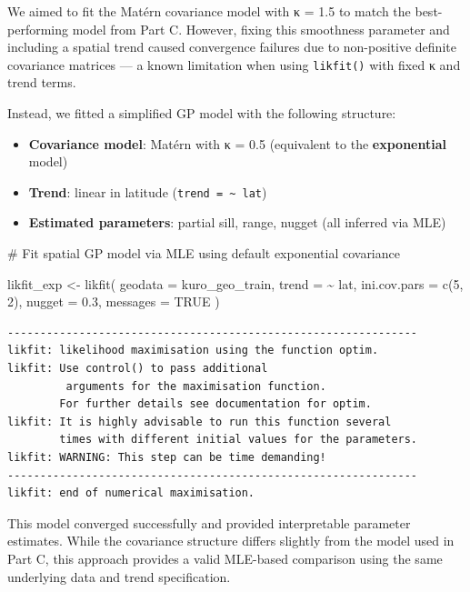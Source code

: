 \documentclass[
  11pt,
]{article}
\newenvironment{Shaded}{\begin{snugshade}}{\end{snugshade}}
\newcommand{\AttributeTok}[1]{\textcolor[rgb]{0.40,0.45,0.13}{#1}}
\newcommand{\CommentTok}[1]{\textcolor[rgb]{0.37,0.37,0.37}{#1}}
\newcommand{\ConstantTok}[1]{\textcolor[rgb]{0.56,0.35,0.01}{#1}}
\newcommand{\DecValTok}[1]{\textcolor[rgb]{0.68,0.00,0.00}{#1}}
\newcommand{\FloatTok}[1]{\textcolor[rgb]{0.68,0.00,0.00}{#1}}
\newcommand{\FunctionTok}[1]{\textcolor[rgb]{0.28,0.35,0.67}{#1}}
\newcommand{\NormalTok}[1]{\textcolor[rgb]{0.00,0.23,0.31}{#1}}
\newcommand{\OtherTok}[1]{\textcolor[rgb]{0.00,0.23,0.31}{#1}}
\newcommand{\SpecialCharTok}[1]{\textcolor[rgb]{0.37,0.37,0.37}{#1}}
\begin{document}
We aimed to fit the Matérn covariance model with κ = 1.5 to match the
best-performing model from Part C. However, fixing this smoothness
parameter and including a spatial trend caused convergence failures due
to non-positive definite covariance matrices --- a known limitation when
using \texttt{likfit()} with fixed κ and trend terms.

Instead, we fitted a simplified GP model with the following structure:

\begin{itemize}
\item
  \textbf{Covariance model}: Matérn with κ = 0.5 (equivalent to the
  \textbf{exponential} model)
\item
  \textbf{Trend}: linear in latitude
  (\texttt{trend\ =\ \textasciitilde{}\ lat})
\item
  \textbf{Estimated parameters}: partial sill, range, nugget (all
  inferred via MLE)
\end{itemize}

\begin{Shaded}
\begin{Highlighting}[]
\CommentTok{\# Fit spatial GP model via MLE using default exponential covariance}

\NormalTok{likfit\_exp }\OtherTok{\textless{}{-}} \FunctionTok{likfit}\NormalTok{(}
  \AttributeTok{geodata =}\NormalTok{ kuro\_geo\_train,}
  \AttributeTok{trend =} \SpecialCharTok{\textasciitilde{}}\NormalTok{ lat,}
  \AttributeTok{ini.cov.pars =} \FunctionTok{c}\NormalTok{(}\DecValTok{5}\NormalTok{, }\DecValTok{2}\NormalTok{),}
  \AttributeTok{nugget =} \FloatTok{0.3}\NormalTok{,}
  \AttributeTok{messages =} \ConstantTok{TRUE}
\NormalTok{)}
\end{Highlighting}
\end{Shaded}

\begin{verbatim}
---------------------------------------------------------------
likfit: likelihood maximisation using the function optim.
likfit: Use control() to pass additional
         arguments for the maximisation function.
        For further details see documentation for optim.
likfit: It is highly advisable to run this function several
        times with different initial values for the parameters.
likfit: WARNING: This step can be time demanding!
---------------------------------------------------------------
likfit: end of numerical maximisation.
\end{verbatim}

This model converged successfully and provided interpretable parameter
estimates. While the covariance structure differs slightly from the
model used in Part C, this approach provides a valid MLE-based
comparison using the same underlying data and trend specification.
\end{document}
